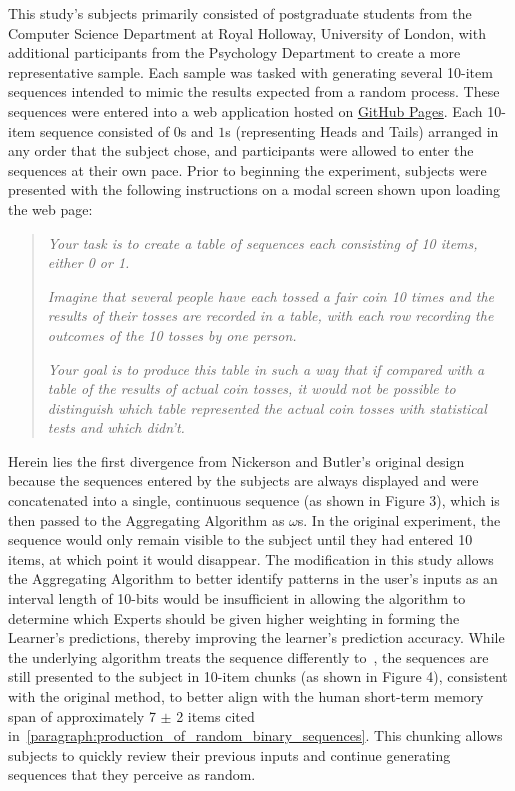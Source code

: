This study's subjects primarily consisted of postgraduate students from the Computer Science Department at Royal Holloway, University of London, with additional participants from the Psychology Department to create a more representative sample. Each sample was tasked with generating several 10-item sequences intended to mimic the results expected from a random process. These sequences were entered into a web application hosted on \href{https://arbarraclough.github.io/aggregating_algorithm/}{GitHub Pages}. Each 10-item sequence consisted of $0$s and $1$s (representing Heads and Tails) arranged in any order that the subject chose, and participants were allowed to enter the sequences at their own pace. Prior to beginning the experiment, subjects were presented with the following instructions on a modal screen shown upon loading the web page:

\begin{quote}
    \textit{Your task is to create a table of sequences each consisting of 10 items, either 0 or 1.}

    \textit{Imagine that several people have each tossed a fair coin 10 times and the results of their tosses are recorded in a table, with each row recording the outcomes of the 10 tosses by one person.}

    \textit{Your goal is to produce this table in such a way that if compared with a table of the results of actual coin tosses, it would not be possible to distinguish which table represented the actual coin tosses with statistical tests and which didn't.}
\end{quote}

\noindent Herein lies the first divergence from Nickerson and Butler's original design because the sequences entered by the subjects are always displayed and were concatenated into a single, continuous sequence (as shown in Figure 3), which is then passed to the Aggregating Algorithm as $\omega$s. In the original experiment, the sequence would only remain visible to the subject until they had entered 10 items, at which point it would disappear. The modification in this study allows the Aggregating Algorithm to better identify patterns in the user's inputs as an interval length of 10-bits would be insufficient in allowing the algorithm to determine which Experts should be given higher weighting in forming the Learner's predictions, thereby improving the learner's prediction accuracy. While the underlying algorithm treats the sequence differently to~\cite{nickerson:2009}, the sequences are still presented to the subject in 10-item chunks (as shown in Figure 4), consistent with the original method, to better align with the human short-term memory span of approximately 7 $\pm$ 2 items cited in~\ref{paragraph:production_of_random_binary_sequences}. This chunking allows subjects to quickly review their previous inputs and continue generating sequences that they perceive as random.

